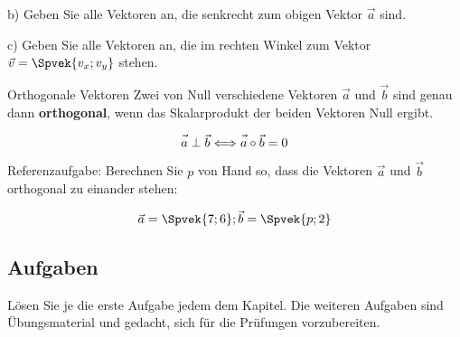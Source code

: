 b) Geben Sie alle Vektoren an, die senkrecht zum obigen Vektor $\vec{a}$ sind.

c) Geben Sie alle Vektoren an, die im rechten Winkel zum Vektor $\vec{v} = \Spvek{v_x;
  v_y}$ stehen.




\begin{gesetz}{Orthogonale Vektoren}{}
  Zwei von Null verschiedene Vektoren $\vec{a}$ und $\vec{b}$ sind genau dann
  \textbf{orthogonal}, wenn das Skalarprodukt der beiden Vektoren
  Null ergibt.


  $$\vec{\vphantom{b}a} \perp \vec{b} \Longleftrightarrow
  \vec{\vphantom{b}a}\circ{}\vec{b} = 0$$
\end{gesetz}

Referenzaufgabe: Berechnen Sie $p$ von Hand so, dass die Vektoren $\vec{a}$ und $\vec{b}$ orthogonal zu einander stehen:

$$\vec{a} = \Spvek{7; 6}; \vec{b} = \Spvek{p; 2}$$



\subsection*{Aufgaben}

Lösen Sie je die erste Aufgabe jedem dem Kapitel. Die weiteren Aufgaben
sind Übungsmaterial und gedacht, sich für die Prüfungen vorzubereiten.

